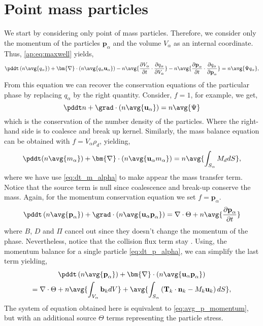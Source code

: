 \section{Point mass particles}
We start by considering only point of mass particles. 
Therefore, we consider only the momentum of the particles $\textbf{p}_\alpha$ and the volume $V_\alpha$ as an internal coordinate.
Thus, \ref{ap:eq:maxwell} yields,
\begin{equation}
    \pddt \left( n \avg{q_\alpha}\right)
    + \bm{\nabla} \cdot \left(n \avg{q_\alpha \textbf{u}_\alpha}\right)
    - n  \avg{\frac{\partial V_\alpha}{\partial t} \cdot \frac{\partial q_\alpha}{\partial V_\alpha}}
    - n  \avg{\frac{\partial \textbf{p}_\alpha}{\partial t} \cdot \frac{\partial q_\alpha}{\partial \textbf{p}_\alpha}}
    = n \avg{\Psi q_\alpha},
\end{equation}
From this equation we can recover the conservation equations of the particular phase by replacing $q_\alpha$ by the right quantity. 
Consider, $f = 1$, for example, we get, 
\begin{equation}
    \pddt n
    + \grad \cdot \left(n \avg{\textbf{u}_\alpha}\right)
    = n\avg{\Psi}
\end{equation}
which is the conservation of the number density of the particles. 
Where the right-hand side is to coalesce and break up kernel.
Similarly, the mass balance equation can be obtained with $f = V_\alpha \rho_d$, yielding,
\begin{equation}
    \pddt (n\avg{m_\alpha})
    + \bm{\nabla} \cdot \left(n \avg{\textbf{u}_\alpha m_\alpha}\right)
    =
    n  \avg{\int_{S_\alpha} M_d dS},
\end{equation}
where we have use \ref{eq:dt_m_alpha} to make appear the mass transfer term. 
Notice that the source term is null since coalescence and break-up conserve the mass. 
Again, for the momentum conservation equation we set $f = \textbf{p}_\alpha$.
\begin{equation}
    \pddt \left( n \avg{\textbf{p}_\alpha}\right)
    + \grad \cdot \left(n \avg{\textbf{u}_\alpha \textbf{p}_\alpha}\right)
    =  \nabla \cdot \Theta
    + n  \avg{\frac{\partial \textbf{p}_\alpha}{\partial t}}
\end{equation}
where $B$, $D$ and $\Pi$ cancel out since they doesn't change the momentum of the phase. 
Nevertheless, notice that the collision flux term stay \citep{rao2008introduction}.
Using, the momentum balance for a single particle \ref{eq:dt_p_alpha}, we can simplify the last term yielding, 
\begin{multline*}
    \pddt \left( n \avg{\textbf{p}_\alpha}\right)
    + \bm{\nabla} \cdot \left(n \avg{\textbf{u}_\alpha \textbf{p}_\alpha }\right)\\
    = 
    \nabla \cdot \Theta
    + n\avg{\int_{V_\alpha} \textbf{b}_k dV}
    + \avg{\int_{S_\alpha} \left(
    \textbf{T}_k\cdot\textbf{n}_k
    - M_k \textbf{u}_k
    \right)dS},
\end{multline*}
The system of equation obtained here is equivalent to \ref{eq:avg_p_momentum}, but with an additional source $\Theta$ terms representing the particle stress.

